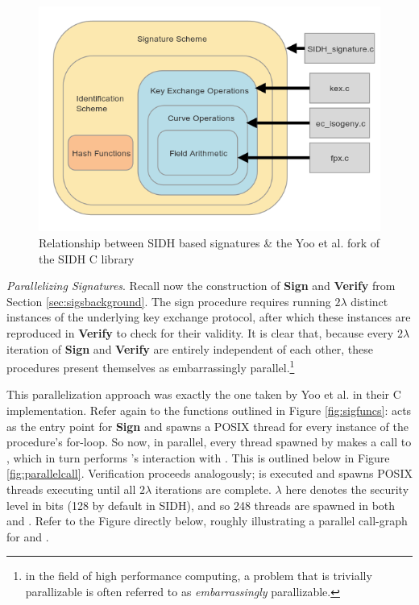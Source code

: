 \begin{figure}[htp]
\centering
\includegraphics[scale=0.7]{fullmapwcurve.png} %
\caption{Relationship between SIDH based signatures \& the Yoo et al. fork of the SIDH C library}
\label{fig:fullmap} %
\end{figure}

\noindent
\emph{Parallelizing Signatures}. Recall now the construction of \textbf{Sign} and \textbf{Verify} from Section \ref{sec:sigsbackground}. The sign procedure requires running $2\lambda$ distinct instances of the underlying key exchange protocol, after which these instances are reproduced in \textbf{Verify} to check for their validity. It is clear that, because every $2\lambda$ iteration of \textbf{Sign} and \textbf{Verify} are entirely independent of each other, these procedures present themselves as embarrassingly parallel.\footnote{in the field of high performance computing, a problem that is trivially parallizable is often referred to as \emph{embarrassingly} parallizable.} 

This parallelization approach was exactly the one taken by Yoo et al. in their C implementation. Refer again to the  functions outlined in Figure \ref{fig:sigfuncs}:  acts as the entry point for \textbf{Sign} and spawns a POSIX thread for every instance of the procedure's for-loop. So now, in parallel, every thread spawned by  makes a call to , which in turn performs \bob's interaction with \randall. This is outlined below in Figure \ref{fig:parallelcall}. Verification proceeds analogously;  is executed and spawns POSIX threads executing  until all $2\lambda$ iterations are complete. $\lambda$ here denotes the security level in bits (128 by default in SIDH), and so 248 threads are spawned in both  and . Refer to the Figure directly below, roughly illustrating a parallel call-graph for  and .

